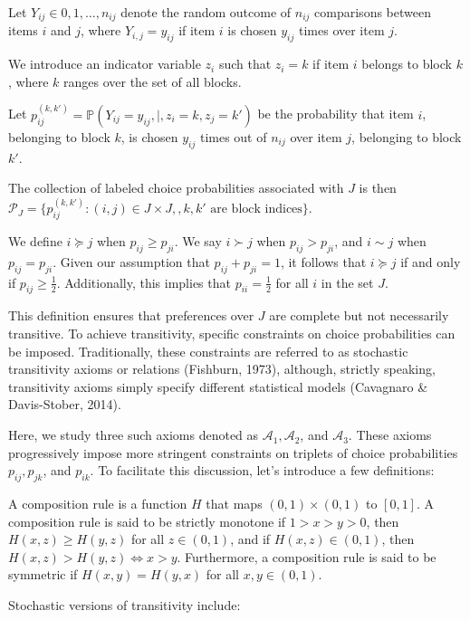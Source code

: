 \documentclass[11pt]{amsart}
\begin{document}
Let $Y_{i j} \in {0, 1, \ldots, n_{i j}}$ denote the random outcome of $n_{i j}$ comparisons between items $i$ and $j$, where $Y_{i, j} = y_{i j}$ if item $i$ is chosen $y_{i j}$ times over item $j$.

We introduce an indicator variable $z_i$ such that $z_i = k$ if item $i$ belongs to block $k$, where $k$ ranges over the set of all blocks.

Let $p_{i j}^{(k, k')} = \mathbb{P}\left(Y_{i j} = y_{i j} ,|, z_i = k, z_j = k'\right)$ be the probability that item $i$, belonging to block $k$, is chosen $y_{i j}$ times out of $n_{i j}$ over item $j$, belonging to block $k'$.

The collection of labeled choice probabilities associated with $J$ is then $ \mathcal{P}_J = \{ p_{i j}^{(k, k')} : (i, j) \in J \times J, , k, k' \text{ are block indices} \}$.




We define $i \succeq j$ when $p_{i j} \geq p_{j i}$. We say $i \succ j$ when $p_{i j} > p_{j i}$, and $i \sim j$ when $p_{i j} = p_{j i}$. Given our assumption that $p_{i j} + p_{j i} = 1$, it follows that $i \succeq j$ if and only if $p_{i j} \geq \frac{1}{2}$. Additionally, this implies that $p_{i i} = \frac{1}{2}$ for all $i$ in the set $J$.

This definition ensures that preferences over $J$ are complete but not necessarily transitive. To achieve transitivity, specific constraints on choice probabilities can be imposed. Traditionally, these constraints are referred to as stochastic transitivity axioms or relations (Fishburn, 1973), although, strictly speaking, transitivity axioms simply specify different statistical models (Cavagnaro \& Davis-Stober, 2014).

Here, we study three such axioms denoted as $\mathcal{A}_1, \mathcal{A}_2$, and $\mathcal{A}_3$. These axioms progressively impose more stringent constraints on triplets of choice probabilities $p_{i j}, p_{j k}$, and $p_{i k}$. To facilitate this discussion, let's introduce a few definitions:

A composition rule is a function $H$ that maps $(0, 1) \times (0, 1)$ to $[0, 1]$. A composition rule is said to be strictly monotone if $1 > x > y > 0$, then $H(x, z) \geq H(y, z)$ for all $z \in (0, 1)$, and if $H(x, z) \in (0, 1)$, then $H(x, z) > H(y, z) \iff x > y$. Furthermore, a composition rule is said to be symmetric if $H(x, y) = H(y, x)$ for all $x, y \in (0, 1)$.

Stochastic versions of transitivity include:
\end{document}
